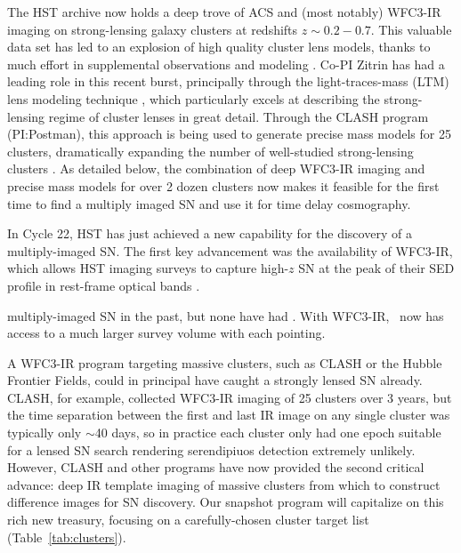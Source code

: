 The HST archive now holds a deep trove of ACS and (most notably)
WFC3-IR imaging on strong-lensing galaxy clusters at redshifts
$z\sim0.2-0.7$.  This valuable data set has led to an explosion of
high quality cluster lens models, thanks to much effort in
supplemental observations and modeling \citep[e.g.][]{Kneib:2004,
Smith:2005, Richard:2009, Limousin:2008, Bradac:2008}.  Co-PI Zitrin
has had a leading role in this recent burst, principally through the
light-traces-mass (LTM) lens modeling
technique \citep{Broadhurst:2005; Zitrin:2009b}, which particularly
excels at describing the strong-lensing regime of cluster lenses in
great detail.  Through the CLASH program (PI:Postman), this approach
is being used to generate precise mass models for 25 clusters,
dramatically expanding the number of well-studied strong-lensing
clusters \citep[e.g.][]{Zitrin:2009a;Zitrin:2009b; Zitrin:2011a;
Zitrin:2011b; Zitrin:2011c; Zitrin:2012a; Zitrin:2012b; Zitrin:2013a;
Zitrin:2013b; Merten:2011a; Coe:2012; Coe:2013}.  As detailed below,
the combination of deep WFC3-IR imaging and precise mass models for
over 2 dozen clusters now makes it feasible for the first time to find
a multiply imaged SN and use it for time delay cosmography.



\medskip
{} In Cycle 22, HST has just achieved a new capability for the discovery of a multiply-imaged SN. The first key advancement was the
availability of WFC3-IR, which allows HST imaging surveys to capture
high-$z$ SN at the peak of their SED profile in rest-frame optical
bands \citep{Rodney:2012,Jones:2013}. 

 multiply-imaged SN in the past, but
none have had  \citep[e.g.][]{Sharon:2010}.  With
WFC3-IR, \Hubble\ now has access to a much larger survey volume with
each pointing.

A WFC3-IR program targeting massive clusters, such as CLASH or the
Hubble Frontier Fields, could in principal have caught a strongly
lensed SN already.  CLASH, for example, collected
WFC3-IR imaging of 25 clusters over 3 years, but the time separation
between the first and last IR image on any single cluster was
typically only $\sim$40 days, so in practice each cluster only had one
epoch suitable for a lensed SN search rendering serendipiuos detection extremely unlikely. 
However, CLASH and other programs have now provided the second critical
advance: deep IR template imaging of massive clusters from which to
construct difference images for SN discovery. Our snapshot program will capitalize on this rich new treasury, focusing on a carefully-chosen cluster target list (Table~\ref{tab:clusters}). 

